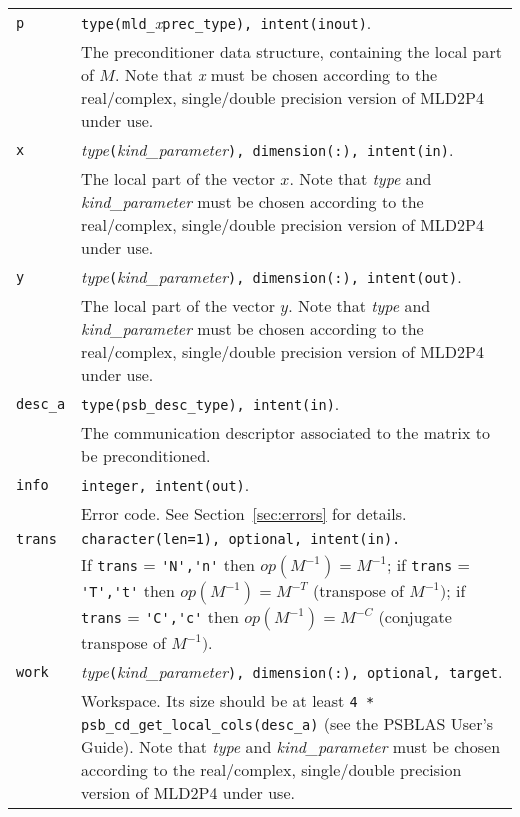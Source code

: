 \begin{tabular}{p{1.2cm}p{11.5cm}}
\verb|p|      & \verb|type(mld_|\emph{x}\verb|prec_type), intent(inout)|.\\
              & The preconditioner data structure, containing the local part of $M$.
                Note that \emph{x} must be chosen according
                to the real/complex, single/double precision version of MLD2P4 under use.\\
\verb|x|      & \emph{type}\verb|(|\emph{kind\_parameter}\verb|), dimension(:), intent(in)|.\\
              & The local part of the vector $x$. Note that \emph{type} and   
                \emph{kind\_parameter} must be chosen according
                to the real/complex, single/double precision version of MLD2P4 under use.\\
\verb|y|      & \emph{type}\verb|(|\emph{kind\_parameter}\verb|), dimension(:), intent(out)|.\\
              & The local part of the vector $y$. Note that \emph{type} and
                \emph{kind\_parameter} must be chosen according
                to the real/complex, single/double precision version of MLD2P4 under use.\\
\verb|desc_a| & \verb|type(psb_desc_type), intent(in)|. \\
              & The communication descriptor associated to the matrix to be
                preconditioned.\\
\verb|info|   & \verb|integer, intent(out)|.\\
              & Error code. See Section~\ref{sec:errors} for details.\\
\verb|trans|  & \verb|character(len=1), optional, intent(in).|\\
              & If \verb|trans| = \verb|'N','n'| then $op(M^{-1}) = M^{-1}$;
                if \verb|trans| = \verb|'T','t'| then $op(M^{-1}) = M^{-T}$
                (transpose of $M^{-1})$;  if \verb|trans| = \verb|'C','c'| then $op(M^{-1}) = M^{-C}$
                (conjugate transpose of $M^{-1})$.\\
\verb|work|  & \emph{type}\verb|(|\emph{kind\_parameter}\verb|), dimension(:), optional, target|.\\
             & Workspace. Its size should be at
               least \verb|4 * psb_cd_get_local_cols(desc_a)| (see the PSBLAS User's Guide).
               Note that \emph{type} and \emph{kind\_parameter} must be chosen according
               to the real/complex, single/double precision version of MLD2P4 under use.\\
\end{tabular}


